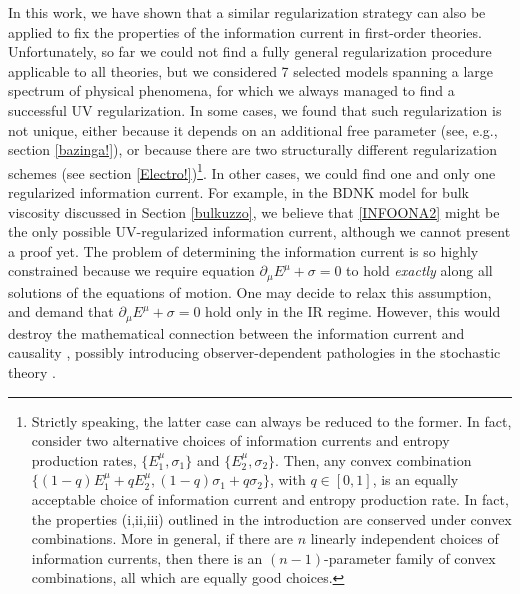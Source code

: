 \documentclass[a4paper, amsfonts, amssymb, amsmath, reprint, showkeys, nofootinbib, twoside,notitlepage,onecolumn,preprintnumbers]{revtex4-2}
\theoremstyle{definition}
\theoremstyle{theorem}
\theoremstyle{corollary}
\begin{document}
In this work, we have shown that a similar regularization strategy can also be applied to fix the properties of the information current in first-order theories. Unfortunately, so far we could not find a fully general regularization procedure applicable to all theories, but we considered 7 selected models spanning a large spectrum of physical phenomena, for which we always managed to find a successful UV regularization. In some cases, we found that such regularization is not unique, either because it depends on an additional free parameter (see, e.g., section \ref{bazinga!}), or because there are two structurally different regularization schemes (see section \ref{Electro!})\footnote{Strictly speaking, the latter case can always be reduced to the former. In fact, consider two alternative choices of information currents and entropy production rates, $\{E^\mu_1,\sigma_1\}$ and $\{E^\mu_2,\sigma_2\}$. Then, any convex combination $\{(1{-}q)E^\mu_1+qE^\mu_2, (1{-}q)\sigma_1+q\sigma_2\}$, with $q \in [0,1]$, is an equally acceptable choice of information current and entropy production rate. In fact, the properties (i,ii,iii) outlined in the introduction are conserved under convex combinations. More in general, if there are $n$ linearly independent choices of information currents, then there is an $(n{-}1)$-parameter family of convex combinations, all which are equally good choices.}. In other cases, we could find one and only one regularized information current. For example, in the BDNK model for bulk viscosity discussed in Section \ref{bulkuzzo}, we believe that \eqref{INFOONA2} might be the only possible UV-regularized information current, although we cannot present a proof yet. The problem of determining the information current is so highly constrained because we require equation $\partial_\mu E^\mu +\sigma=0$ to hold \textit{exactly} along all solutions of the equations of motion. One may decide to relax this assumption, and demand that $\partial_\mu E^\mu+\sigma=0$ hold only in the IR regime. However, this would destroy the mathematical connection between the information current and causality \cite{GavassinoCausality2021}, possibly introducing observer-dependent pathologies in the stochastic theory \cite{GavassinoSuperluminal2021}.
\end{document}
